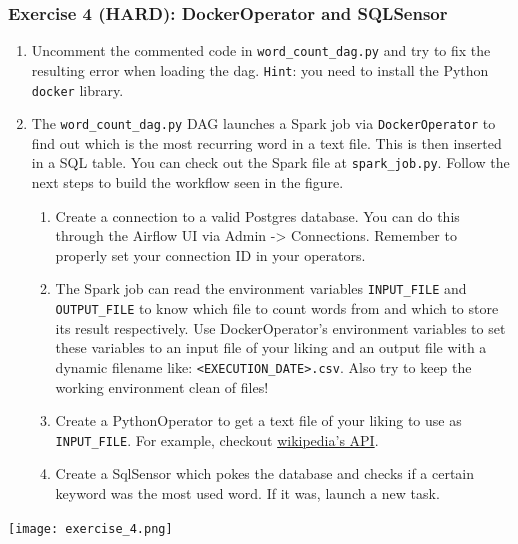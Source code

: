 \documentclass[leqno, 10pt, envcountsect]{beamer}
\numberwithin{equation}{section}
\theoremstyle{definition}
\theoremstyle{example}
\numberwithin{figure}{section}
\numberwithin{table}{section}
\let\olditem\item
\renewcommand{\item}{%
\olditem\vspace{1pt}}
\begin{document}
\begin{frame}[fragile=singleslide]
  \frametitle{Exercise 4 (HARD): DockerOperator and SQLSensor}
  \begin{enumerate}
    \item Uncomment the commented code in \texttt{word\_count_dag.py} and try to
      fix the resulting error when loading the dag. \texttt{Hint}: you need to
      install the Python \texttt{docker} library.
    \item The \texttt{word\_count_dag.py} DAG launches a Spark job via
      \texttt{DockerOperator} to find out which is the most recurring word in a
      text file. This is then inserted in a SQL table. You can check out the
      Spark file at \texttt{spark_job.py}.  Follow the next steps to build the
      workflow seen in the figure.
    \begin{enumerate}
      \item Create a connection to a valid Postgres database. You can do this
        through the Airflow UI via Admin -> Connections. Remember to properly
        set your connection ID in your operators.
      \item The Spark job can read the environment variables
        \texttt{INPUT\_FILE} and \texttt{OUTPUT\_FILE} to know which file to
        count words from and which to store its result respectively. Use
        DockerOperator's environment variables to set these variables to an
        input file of your liking and an output file with a dynamic filename
        like: \texttt{<EXECUTION\_DATE>.csv}. Also try to keep the working
        environment clean of files!
      \item Create a PythonOperator to get a text file of your liking to use as
        \texttt{INPUT\_FILE}. For example, checkout
        \href{https://wikipedia.readthedocs.io/en/latest/code.html}{wikipedia's
        API}.
      \item Create a SqlSensor which pokes the database and checks if a certain
        keyword was the most used word. If it was, launch a new task.
    \end{enumerate}
  \end{enumerate}
  \begin{center}
    \texttt{[image: exercise\_4.png]}
  \end{center}
\end{frame}
\end{document}
